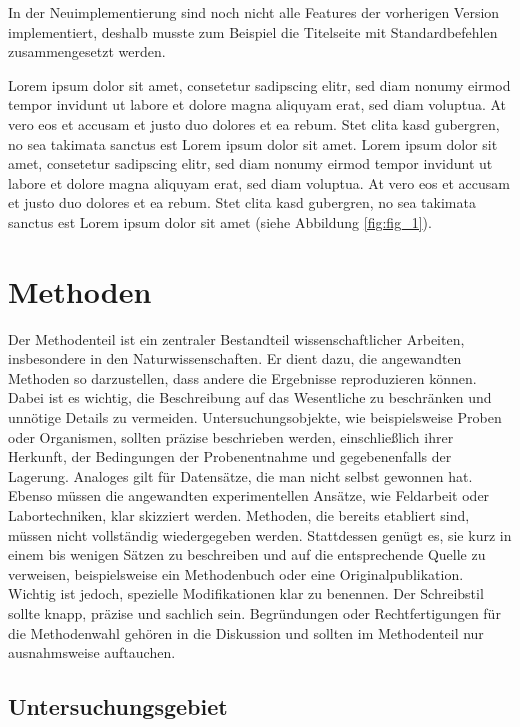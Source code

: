 \documentclass[fontsize=12pt,BCOR=12mm,logo/language=de]{tudcdreprt}
\begin{document}
In der Neuimplementierung sind noch nicht alle Features der vorherigen Version 
implementiert, deshalb musste zum Beispiel die Titelseite mit Standardbefehlen 
zusammengesetzt werden.

Lorem ipsum dolor sit amet, consetetur sadipscing elitr, sed diam nonumy eirmod
tempor invidunt ut labore et dolore magna aliquyam erat, sed diam voluptua. At
vero eos et accusam et justo duo dolores et ea rebum. Stet clita kasd gubergren,
no sea takimata sanctus est Lorem ipsum dolor sit amet. Lorem ipsum dolor sit
amet, consetetur sadipscing elitr, sed diam nonumy eirmod tempor invidunt ut
labore et dolore magna aliquyam erat, sed diam voluptua. At vero eos et accusam
et justo duo dolores et ea rebum. Stet clita kasd gubergren, no sea takimata
sanctus est Lorem ipsum dolor sit amet (siehe Abbildung \ref{fig:fig_1}).

\chapter{Methoden}

Der Methodenteil ist ein zentraler Bestandteil wissenschaftlicher Arbeiten, insbesondere in den Naturwissenschaften. 
Er dient dazu, die angewandten Methoden so darzustellen, dass andere die Ergebnisse reproduzieren können.
Dabei ist es wichtig, die Beschreibung auf das Wesentliche zu beschränken und unnötige Details zu vermeiden.
Untersuchungsobjekte, wie beispielsweise Proben oder Organismen, sollten präzise beschrieben werden, einschließlich ihrer Herkunft, der Bedingungen der Probenentnahme und gegebenenfalls der Lagerung.
Analoges gilt für Datensätze, die man nicht selbst gewonnen hat.
Ebenso müssen die angewandten experimentellen Ansätze, wie Feldarbeit oder Labortechniken, klar skizziert werden.
Methoden, die bereits etabliert sind, müssen nicht vollständig wiedergegeben werden. Stattdessen genügt es, sie kurz in einem bis wenigen Sätzen zu beschreiben und auf die entsprechende Quelle zu verweisen, beispielsweise ein Methodenbuch oder eine Originalpublikation. Wichtig ist jedoch, spezielle Modifikationen klar zu benennen.
Der Schreibstil sollte knapp, präzise und sachlich sein.
Begründungen oder Rechtfertigungen für die Methodenwahl gehören in die Diskussion und sollten im Methodenteil nur ausnahmsweise auftauchen.


\section{Untersuchungsgebiet}
\end{document}
